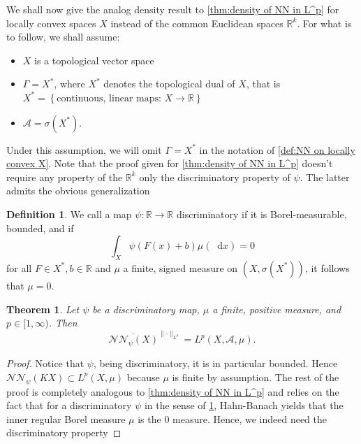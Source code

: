 \documentclass[11pt,a4paper,twoside,openany]{report}
\newcommand{\diff}{\mathop{}\!\mathrm{d}}
\theoremstyle{plain} %
\newtheorem{theorem}{Theorem}[chapter]
\theoremstyle{definition} %
\newtheorem{definition}[definition]{Definition}
\theoremstyle{remark} %
\begin{document}
We shall now give the analog density result to \cref{thm:density of NN in L^p} for locally convex spaces \(X\) instead of the common Euclidean spaces \(\mathbb{R}^k\). For what is to follow, we shall assume:
\begin{itemize}
    \item \(X\) is a topological vector space
    \item\(\Gamma = X^*\), where \(X^*\) denotes the topological dual of \(X\), that is \(X^*=\left\{\text{continuous, linear maps: }X\to\mathbb{R}\right\}\)
    \item\(\mathcal{A}=\sigma(X^*)\).
\end{itemize}
Under this assumption, we will omit \(\Gamma =X^*\) in the notation of \cref{def:NN on locally convex X}.
Note that the proof given for \cref{thm:density of NN in L^p} doesn't require any property of the \(\mathbb{R}^k\) only the discriminatory property of \(\psi\). The latter admits the obvious generalization
\begin{definition}\label{def:discriminatory property of X}
 We call a map \(\psi:\mathbb{R}\to\mathbb{R}\) discriminatory if it is Borel-measurable, bounded, and if
    \begin{equation}
        \int_{X}\psi(F(x)+b)\mu(\diff x)=0
    \end{equation}
    for all \(F\in X^*,b\in\mathbb{R}\) and \(\mu\) a finite, signed measure on \((X,\sigma(X^*))\), it follows that \(\mu=0\).    
\end{definition}
\begin{theorem}\label{thm:density of NN in L^p on topological vector space}
    Let \(\psi\) be a discriminatory map, \(\mu\) a finite, positive measure, and \(p\in[1,\infty)\). Then
    \begin{equation}
         \overline{\mathcal{NN}_{\psi}(X)}^{\lVert\cdot\rVert_{L^p}}=L^p(X,\mathcal{A},\mu).
    \end{equation}
\end{theorem} 
\begin{proof}
    Notice that \(\psi\), being discriminatory, it is in particular bounded. Hence \(\mathcal{NN}_{\psi}(K
    X)\subset L^p(X,\mu)\) because \(\mu\) is finite by assumption. The rest of the proof is completely analogous to \cref{thm:density of NN in L^p} and relies on the fact that for a discriminatory \(\psi\) in the sense of \cref{def:discriminatory property of X}, Hahn-Banach yields that the inner regular Borel measure \(\mu\) is the \(0\) measure. Hence, we indeed need the discriminatory property 
\end{proof}
\end{document}
